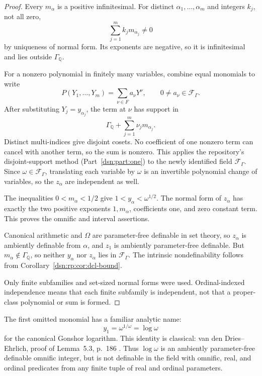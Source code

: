 \documentclass[11pt,a4paper]{article}
\numberwithin{equation}{section}
\theoremstyle{definition}
\theoremstyle{remark}
\newcommand{\Q}{\mathbb Q}
\begin{document}
\begin{proof}
Every \(m_\alpha\) is a positive infinitesimal. For distinct
\(\alpha_1,\ldots,\alpha_m\) and integers \(k_j\), not all zero,
\[
 \sum_{j=1}^{m}k_jm_{\alpha_j}\ne0
\]
by uniqueness of normal form. Its exponents are negative, so it
is infinitesimal and lies outside \(\Gamma_{\Q}\).

For a nonzero polynomial in finitely many variables, combine equal
monomials to write
\[
 P(Y_1,\ldots,Y_m)=\sum_{\nu\in F}a_\nu Y^\nu,\qquad
 0\ne a_\nu\in\mathcal F_\Gamma.
\]
After substituting \(Y_j=y_{\alpha_j}\), the term at \(\nu\) has
support in
\[
 \Gamma_{\Q}+\sum_{j=1}^{m}\nu_jm_{\alpha_j}.
\]
Distinct multi-indices give disjoint cosets. No coefficient of one
nonzero term can cancel with another term, so the sum is nonzero.
This applies the repository's disjoint-support method
(Part~\ref{dsn:part:one}) to the newly identified field \(\mathcal F_\Gamma\).
Since \(\omega\in\mathcal F_\Gamma\), translating each variable by
\(\omega\) is an invertible polynomial change of variables, so
the \(z_\alpha\) are independent as well.

The inequalities \(0<m_\alpha<1/2\) give
\(1<y_\alpha<\omega^{1/2}\). The normal form of \(z_\alpha\)
has exactly the two positive exponents \(1,m_\alpha\), coefficients
one, and zero constant term. This proves the omnific and interval
assertions.

Canonical arithmetic and \(\Omega\) are parameter-free definable
in set theory, so \(z_\alpha\) is ambiently definable from \(\alpha\),
and \(z_1\) is ambiently parameter-free definable.
But \(m_\alpha\notin \Gamma_{\Q}\), so neither \(y_\alpha\) nor \(z_\alpha\)
lies in \(\mathcal F_\Gamma\). The intrinsic nondefinability follows from
Corollary~\ref{dsn:rp:cor:dcl-bound}.

Only finite subfamilies and set-sized normal forms were used.
Ordinal-indexed independence means that each finite subfamily is
independent, not that a proper-class polynomial or sum is formed.
\end{proof}

The first omitted monomial has a familiar analytic name:
\[
 y_1=\omega^{1/\omega}=\log\omega
\]
for the canonical Gonshor logarithm. This identity is classical:
van den Dries--Ehrlich, proof of Lemma~5.3, p.~186
\cite{vdDE}. Thus \(\log\omega\) is an ambiently
parameter-free definable omnific integer, but is not definable in
the field with omnific, real, and ordinal predicates from any finite
tuple of real and ordinal parameters.
\end{document}
